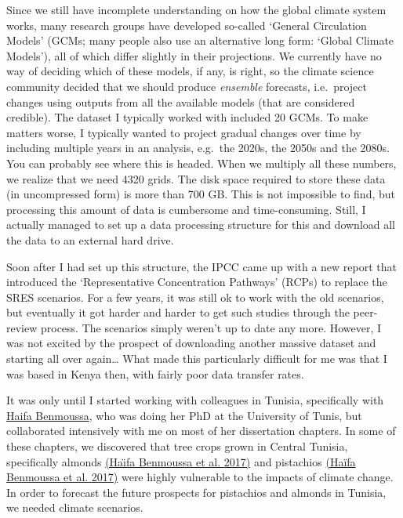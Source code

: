 \documentclass[
]{book}
\begin{document}
Since we still have incomplete understanding on how the global climate system works, many research groups have developed so-called `General Circulation Models' (GCMs; many people also use an alternative long form: `Global Climate Models'), all of which differ slightly in their projections. We currently have no way of deciding which of these models, if any, is right, so the climate science community decided that we should produce \emph{ensemble} forecasts, i.e.~project changes using outputs from all the available models (that are considered credible). The dataset I typically worked with included 20 GCMs. To make matters worse, I typically wanted to project gradual changes over time by including multiple years in an analysis, e.g.~the 2020s, the 2050s and the 2080s. You can probably see where this is headed. When we multiply all these numbers, we realize that we need 4320 grids. The disk space required to store these data (in uncompressed form) is more than 700 GB. This is not impossible to find, but processing this amount of data is cumbersome and time-consuming. Still, I actually managed to set up a data processing structure for this and download all the data to an external hard drive.

Soon after I had set up this structure, the IPCC came up with a new report that introduced the `Representative Concentration Pathways' (RCPs) to replace the SRES scenarios. For a few years, it was still ok to work with the old scenarios, but eventually it got harder and harder to get such studies through the peer-review process. The scenarios simply weren't up to date any more. However, I was not excited by the prospect of downloading another massive dataset and starting all over again\ldots{} What made this particularly difficult for me was that I was based in Kenya then, with fairly poor data transfer rates.

It was only until I started working with colleagues in Tunisia, specifically with \href{https://scholar.google.de/citations?hl=de\&user=DdV9jsAAAAAJ}{Haifa Benmoussa}, who was doing her PhD at the University of Tunis, but collaborated intensively with me on most of her dissertation chapters. In some of these chapters, we discovered that tree crops grown in Central Tunisia, specifically almonds \href{https://www.sciencedirect.com/science/article/pii/S0168192317300734}{(Haı̈fa Benmoussa et al. \protect\hyperlink{ref-benmoussa2017chilling}{2017})} and pistachios \href{https://www.sciencedirect.com/science/article/abs/pii/S0098847217301119}{(Haïfa Benmoussa et al. \protect\hyperlink{ref-benmoussa_performance_2017}{2017})} were highly vulnerable to the impacts of climate change. In order to forecast the future prospects for pistachios and almonds in Tunisia, we needed climate scenarios.
\end{document}

